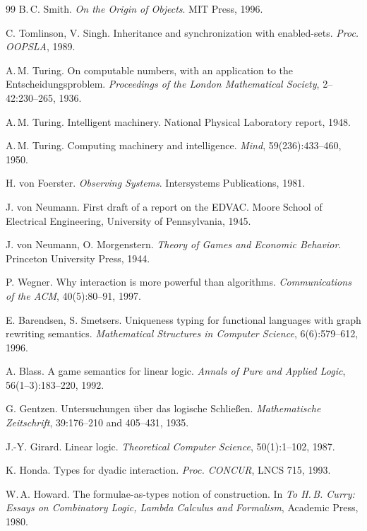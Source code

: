 \begin{thebibliography}{99}
B.\,C. Smith. \emph{On the Origin of Objects}. MIT Press, 1996.

C. Tomlinson, V. Singh. Inheritance and synchronization
with enabled-sets. \emph{Proc. OOPSLA}, 1989.

A.\,M. Turing. On computable numbers, with an application to
the Entscheidungsproblem. \emph{Proceedings of the London Mathematical Society},
2--42:230--265, 1936.

A.\,M. Turing. Intelligent machinery. National Physical
Laboratory report, 1948.

A.\,M. Turing. Computing machinery and intelligence.
\emph{Mind}, 59(236):433--460, 1950.

H. von Foerster. \emph{Observing Systems}. Intersystems
Publications, 1981.

J. von Neumann. First draft of a report on the EDVAC.
Moore School of Electrical Engineering, University of Pennsylvania, 1945.

J. von Neumann, O. Morgenstern. \emph{Theory of Games and
Economic Behavior}. Princeton University Press, 1944.

P. Wegner. Why interaction is more powerful than algorithms.
\emph{Communications of the ACM}, 40(5):80--91, 1997.

E. Barendsen, S. Smetsers. Uniqueness typing for
functional languages with graph rewriting semantics. \emph{Mathematical
Structures in Computer Science}, 6(6):579--612, 1996.

A. Blass. A game semantics for linear logic. \emph{Annals of
Pure and Applied Logic}, 56(1--3):183--220, 1992.

G. Gentzen. Untersuchungen \"uber das logische Schlie{\ss}en.
\emph{Mathematische Zeitschrift}, 39:176--210 and 405--431, 1935.

J.-Y. Girard. Linear logic. \emph{Theoretical Computer
Science}, 50(1):1--102, 1987.

K. Honda. Types for dyadic interaction. \emph{Proc. CONCUR},
LNCS 715, 1993.

W.\,A. Howard. The formulae-as-types notion of construction.
In \emph{To H.\,B. Curry: Essays on Combinatory Logic, Lambda Calculus and
Formalism}, Academic Press, 1980.


\end{thebibliography}
